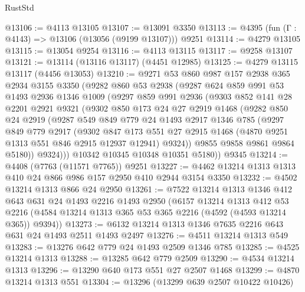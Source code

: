 \begin{lexlean}{RustStd}
\begin{coremodule}
@13106 := @4113 @13105
@13107 := @13091 @3350
@13113 := @4395 (fun (Γ : @4143) => @13106 (@13056 (@9199 @13107))) @9251
@13114 := @4279 @13105
@13115 := @13054 @9254
@13116 := @4113 @13115
@13117 := @9258 @13107
@13121 := @13114 (@13116 @13117) (@4451 @12985)
@13125 := @4279 @13115 @13117 (@4456 @13053)
@13210 := @9271
    @53
    @860
    @987
    @157
    @2938
    @365
    @2934
    @3155
    @3350
    (@9282
      @860
      @53
      @2938
      (@9287
        @624
        @859
        @991
        @53
        @1493
        @2936
        @1346
        @1009
        (@9297
          @859
          @991
          @2936
          (@9303
            @852
            @141
            @28
            @2201
            @2921
            @9321
            (@9302
              @850
              @173
              @24
              @27
              @2919
              @1468
              (@9282
                @850
                @24
                @2919
                (@9287
                  @549
                  @849
                  @779
                  @24
                  @1493
                  @2917
                  @1346
                  @785
                  (@9297
                    @849
                    @779
                    @2917
                    (@9302
                      @847
                      @173
                      @551
                      @27
                      @2915
                      @1468
                      (@4870 @9251 @1313 @551 @846 @2915 @12937 @12941)
                      @9324))
                  @9855
                  @9858
                  @9861
                  @9864
                  @5180))
              @9324)))
        @10342
        @10345
        @10348
        @10351
        @5180))
    @9345
@13214 := @4408 (@7763 (@11571 @7765)) @9251
@13227 := @4462 @13214 @1313 @1313 @410 @24 @866 @986 @157 @2950 @410 @2944 @3154 @3350
@13232 := @4502 @13214 @1313 @866 @24 @2950
@13261 := @7522
    @13214
    @1313
    @1346
    @412
    @643
    @631
    @24
    @1493
    @2216
    @1493
    @2950
    (@6157
      @13214
      @1313
      @412
      @53
      @2216
      (@4584 @13214 @1313 @365 @53 @365 @2216 (@4592 (@4593 @13214 @365)) @9394))
@13273 := @6132 @13214 @1313 @1346 @7635 @2216 @643 @631 @24 @1493 @2511 @1493 @2497
@13276 := @4511 @13214 @1313 @549
@13283 := @13276 @642 @779 @24 @1493 @2509 @1346 @785
@13285 := @4525 @13214 @1313
@13288 := @13285 @642 @779 @2509
@13290 := @4534 @13214 @1313
@13296 := @13290 @640 @173 @551 @27 @2507 @1468
@13299 := @4870 @13214 @1313 @551
@13304 := @13296 (@13299 @639 @2507 @10422 @10426)

\end{coremodule}
\end{lexlean}

